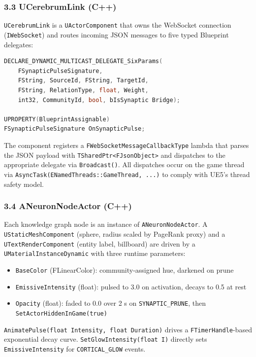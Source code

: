 \subsubsection*{3.3 UCerebrumLink (C++)}

\texttt{UCerebrumLink} is a \texttt{UActorComponent} that owns the WebSocket connection (\texttt{IWebSocket}) and routes incoming JSON messages to five typed Blueprint delegates:

\begin{lstlisting}[language=Cpp]
DECLARE_DYNAMIC_MULTICAST_DELEGATE_SixParams(
    FSynapticPulseSignature,
    FString, SourceId, FString, TargetId,
    FString, RelationType, float, Weight,
    int32, CommunityId, bool, bIsSynaptic Bridge);

UPROPERTY(BlueprintAssignable)
FSynapticPulseSignature OnSynapticPulse;
\end{lstlisting}

The component registers a \texttt{FWebSocketMessageCallbackType} lambda that parses the JSON payload with \texttt{TSharedPtr<FJsonObject>} and dispatches to the appropriate delegate via \texttt{Broadcast()}. All dispatches occur on the game thread via \texttt{AsyncTask(ENamedThreads::GameThread, ...)} to comply with UE5's thread safety model.

\subsubsection*{3.4 ANeuronNodeActor (C++)}

Each knowledge graph node is an instance of \texttt{ANeuronNodeActor}. A \texttt{UStaticMeshComponent} (sphere, radius scaled by PageRank proxy) and a \texttt{UTextRenderComponent} (entity label, billboard) are driven by a \texttt{UMaterialInstanceDynamic} with three runtime parameters:

\begin{itemize}
  \item \texttt{BaseColor} (FLinearColor): community-assigned hue, darkened on prune
  \item \texttt{EmissiveIntensity} (float): pulsed to 3.0 on activation, decays to 0.5 at rest
  \item \texttt{Opacity} (float): faded to 0.0 over 2 s on \texttt{SYNAPTIC\_PRUNE}, then \texttt{SetActorHiddenInGame(true)}
\end{itemize}


\texttt{AnimatePulse(float Intensity, float Duration)} drives a \texttt{FTimerHandle}-based exponential decay curve. \texttt{SetGlowIntensity(float I)} directly sets \texttt{EmissiveIntensity} for \texttt{CORTICAL\_GLOW} events.

